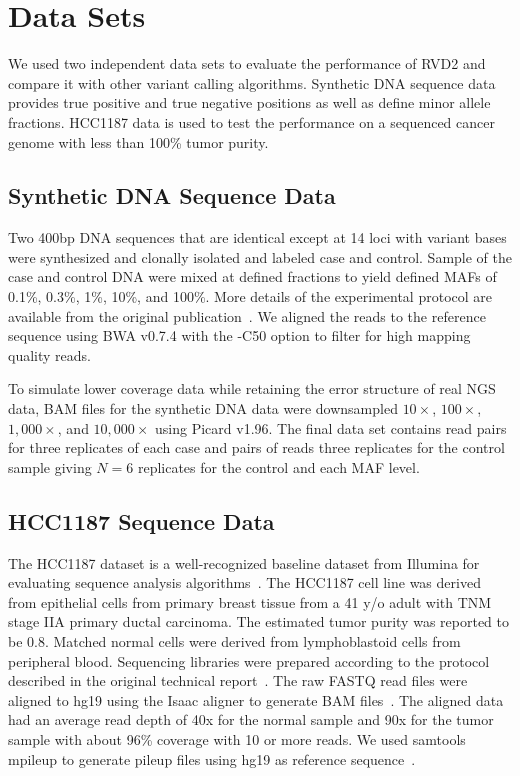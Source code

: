 \documentclass{bioinfo}
\begin{document}
\section{Data Sets}

We used two independent data sets to evaluate the performance of RVD2 and compare it with other variant calling algorithms. Synthetic DNA sequence data provides true positive and true negative positions as well as define minor allele fractions. HCC1187 data is used to test the performance on a sequenced cancer genome with less than 100\% tumor purity.

\subsection{Synthetic DNA Sequence Data}

Two 400bp DNA sequences that are identical except at 14 loci with variant bases were synthesized and clonally isolated and labeled case and control. Sample of the case and control DNA were mixed at defined fractions to yield defined MAFs of 0.1\%, 0.3\%, 1\%, 10\%, and 100\%. More details of the experimental protocol are available from the original publication~\citep{Flaherty:2011ja}. We aligned the reads to the reference sequence using BWA v0.7.4 with the -C50 option to filter for high mapping quality reads.

To simulate lower coverage data while retaining the error structure of real NGS data, BAM files for the synthetic DNA data were downsampled $10\times$, $100\times$, $1,000\times$, and $10,000\times$ using Picard v1.96. The final data set contains read pairs for three replicates of each case and pairs of reads three replicates for the control sample giving $N=6$ replicates for the control and each MAF level.

\subsection{HCC1187 Sequence Data}

The HCC1187 dataset is a well-recognized baseline dataset from Illumina for evaluating sequence analysis algorithms~\citep{newman2013relative,howarth2011large,howarth2007array}. The HCC1187 cell line was derived from  epithelial cells from primary breast tissue from a 41 y/o adult with TNM stage IIA primary ductal carcinoma. The estimated tumor purity was reported to be 0.8. Matched normal cells were derived from lymphoblastoid cells from peripheral blood. Sequencing libraries were prepared according to the protocol described in the original technical report~\citep{hcc1187techreport}. The raw FASTQ read files were aligned to hg19 using the Isaac aligner to generate BAM files~\citep{raczy2013isaac}. The aligned data had an average read depth of 40x for the normal sample and 90x for the tumor sample with about 96\% coverage with 10 or more reads. We used samtools mpileup to generate pileup files using hg19 as reference sequence~\citep{Navin:2010gu}.
\end{document}
